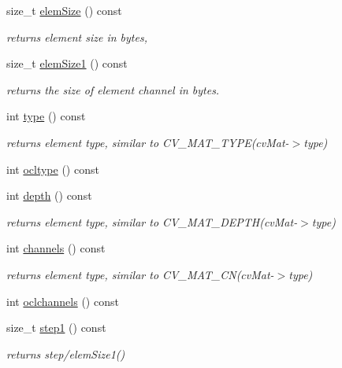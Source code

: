 \begin{DoxyCompactItemize}
size\-\_\-t \hyperlink{classcv_1_1ocl_1_1oclMat_a1de55188d5af96a1a022d3133552ffd9}{elem\-Size} () const 
\begin{DoxyCompactList}\small\item\em returns element size in bytes, \end{DoxyCompactList}\item 
size\-\_\-t \hyperlink{classcv_1_1ocl_1_1oclMat_a5b326c91f92154e5ff83b5652d839f11}{elem\-Size1} () const 
\begin{DoxyCompactList}\small\item\em returns the size of element channel in bytes. \end{DoxyCompactList}\item 
int \hyperlink{classcv_1_1ocl_1_1oclMat_acf6fe0735d1dac151e2c301f01470827}{type} () const 
\begin{DoxyCompactList}\small\item\em returns element type, similar to C\-V\-\_\-\-M\-A\-T\-\_\-\-T\-Y\-P\-E(cv\-Mat-\/$>$type) \end{DoxyCompactList}\item 
int \hyperlink{classcv_1_1ocl_1_1oclMat_a0a9f2229824edf123947d5cb54d828fe}{ocltype} () const 
\item 
int \hyperlink{classcv_1_1ocl_1_1oclMat_a6524ddd17e3b832159515533d64e67d8}{depth} () const 
\begin{DoxyCompactList}\small\item\em returns element type, similar to C\-V\-\_\-\-M\-A\-T\-\_\-\-D\-E\-P\-T\-H(cv\-Mat-\/$>$type) \end{DoxyCompactList}\item 
int \hyperlink{classcv_1_1ocl_1_1oclMat_a16c42ad18b85e6c55ce5e8ec5fcbd114}{channels} () const 
\begin{DoxyCompactList}\small\item\em returns element type, similar to C\-V\-\_\-\-M\-A\-T\-\_\-\-C\-N(cv\-Mat-\/$>$type) \end{DoxyCompactList}\item 
int \hyperlink{classcv_1_1ocl_1_1oclMat_a7a49c475a2be5e83c505834e213bb5bf}{oclchannels} () const 
\item 
size\-\_\-t \hyperlink{classcv_1_1ocl_1_1oclMat_a6e2fee6844dea9694975f23c67b4049d}{step1} () const 
\begin{DoxyCompactList}\small\item\em returns step/elem\-Size1() \end{DoxyCompactList}\item 

\end{DoxyCompactItemize}
